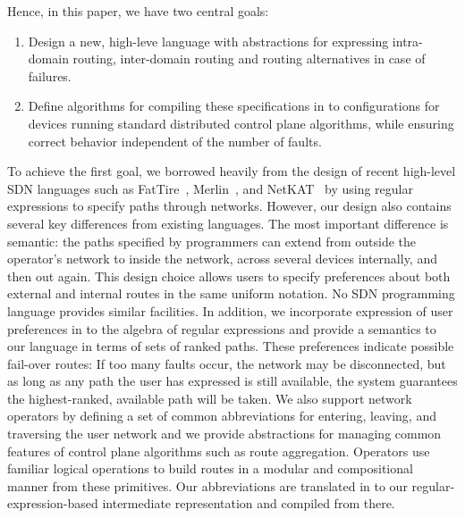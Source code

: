 Hence, in this paper, we have two central goals:
\begin{enumerate}
\item Design a new, high-leve language with abstractions 
for expressing intra-domain routing, inter-domain 
routing and routing alternatives in case of failures.
\item Define algorithms for compiling these specifications in to 
configurations for devices running standard
distributed control plane algorithms, while ensuring correct behavior
independent of the number of faults.
\end{enumerate}

To achieve the first goal, we borrowed heavily from the design of
recent high-level SDN languages such as FatTire~\cite{fattire}, 
Merlin~\cite{foster:merlin}, and
NetKAT~\cite{netkat} by using regular expressions to specify paths
through networks.  However, our design also contains several key
differences from existing languages.  The most important difference is semantic:  the paths specified
by programmers can extend from outside the operator's network to inside
the network, across several devices internally, and then out again.  This design
choice allows users to specify preferences about both external and internal 
routes in the same uniform notation.  No SDN programming language provides
similar facilities.  In addition,
we incorporate expression of user preferences in to the algebra
of regular expressions and provide a semantics to our language
in terms of sets of ranked paths.  These preferences indicate possible
fail-over routes:  If too many faults occur, the network may be
disconnected, but as long as any path the user has expressed is
still available, the system guarantees the highest-ranked, available
path will be taken.  We also support network operators by defining a
set of common abbreviations for entering, leaving, and traversing
the user network and we provide abstractions for managing common features of
control plane algorithms such as route aggregation.  Operators use familiar logical operations
to build routes in a modular and compositional manner from these 
primitives.  Our abbreviations are translated in to our regular-expression-based
intermediate representation and compiled from there.

